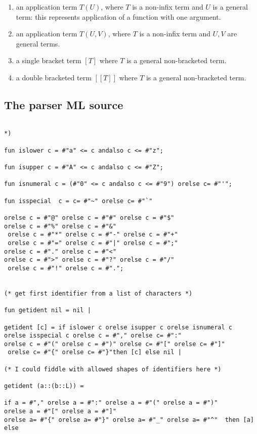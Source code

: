 \documentclass{article}
\begin{document}
{{\begin{enumerate}
\item  an application term $T(U)$, where $T$ is a non-infix term and $U$ is a general term:
this represents application of a function with one argument.

\item an application term $T(U,V)$, where $T$ is a non-infix term and $U,V$ are general terms.

\item a single bracket term $[T]$ where $T$ is a general non-bracketed term.

\item a double bracketed term $[[T]]$ where $T$ is a general non-bracketed term.



\end{enumerate}

\subsection{The parser ML source}


\begin{verbatim}

*)

fun islower c = #"a" <= c andalso c <= #"z";

fun isupper c = #"A" <= c andalso c <= #"Z";

fun isnumeral c = (#"0" <= c andalso c <= #"9") orelse c= #"'";

fun isspecial  c = c= #"~" orelse c= #"`"

orelse c = #"@" orelse c = #"#" orelse c = #"$" 
orelse c = #"%" orelse c = #"&"
 orelse c = #"*" orelse c = #"-" orelse c = #"+"
 orelse c = #"=" orelse c = #"|" orelse c = #";" 
orelse c = #"." orelse c = #"<" 
orelse c = #">" orelse c = #"?" orelse c = #"/"
 orelse c = #"!" orelse c = #".";


(* get first identifier from a list of characters *)

fun getident nil = nil |

getident [c] = if islower c orelse isupper c orelse isnumeral c 
orelse isspecial c orelse c = #"," orelse c= #":" 
orelse c = #"(" orelse c = #")" orelse c= #"[" orelse c= #"]"
 orelse c= #"{" orelse c= #"}"then [c] else nil |

(* I could fiddle with allowed shapes of identifiers here *)

getident (a::(b::L)) = 

if a = #"," orelse a = #":" orelse a = #"(" orelse a = #")" 
orelse a = #"[" orelse a = #"]"  
orelse a= #"{" orelse a= #"}" orelse a= #"_" orelse a= #"^"  then [a] else
 

\end{verbatim}}}
\end{document}
